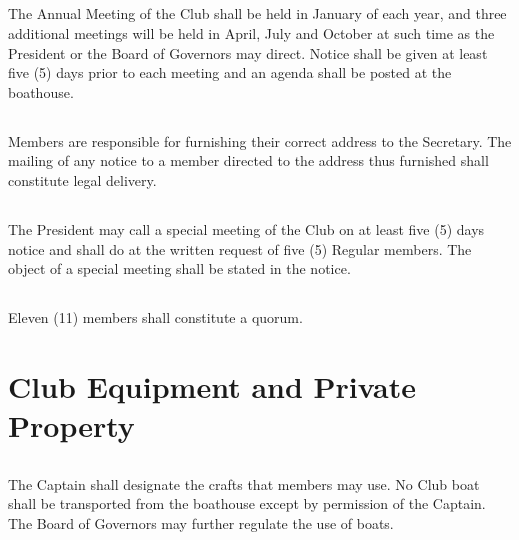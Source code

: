 \documentclass[11pt,american,letterpaper,]{constitution}
\begin{document}
\subsection[Annual Meeting]{} 

The Annual Meeting of the Club shall be held in January of each year, and three additional meetings will be held in April, July and October at such time as the President or the Board of Governors may direct. Notice shall be given at least five (5) days prior to each meeting and an agenda shall be posted at the boathouse.

\subsection[Mailings]{} 

Members are responsible for furnishing their correct address to the Secretary. The mailing of any notice to a member directed to the address thus furnished shall constitute legal delivery.

\subsection[Special Meetings]{} 

The President may call a special meeting of the Club on at least five (5) days notice and shall do at the written request of five (5) Regular members. The object of a special meeting shall be stated in the notice.

\subsection[Quorum]{} 

Eleven (11) members shall constitute a quorum.

\section{Club Equipment and Private Property}

\subsection[Equipment Use]{} 

The Captain shall designate the crafts that members may use. No Club boat shall be transported from the boathouse except by permission of the Captain. The Board of Governors may further regulate the use of boats.

\subsection[Allowed Use]{} 
\end{document}
